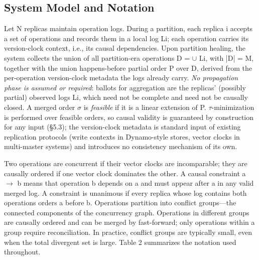 \documentclass[journal]{IEEEtran}
\begin{document}
\subsection{System Model and Notation}
Let N replicas maintain operation logs. During a partition, each replica i accepts a set of operations and records them in a local log Li; each operation carries its version-clock context, i.e., its causal dependencies. Upon partition healing, the system collects the union of all partition-era operations D = $\cup$ Li, with |D| = M, together with the union happens-before partial order P over D, derived from the per-operation version-clock metadata the logs already carry. \emph{No propagation phase is assumed or required}: ballots for aggregation are the replicas' (possibly partial) observed logs Li, which need not be complete and need not be causally closed. A merged order $\sigma$ is \emph{feasible} if it is a linear extension of P. $\tau$-minimization is performed over feasible orders, so causal validity is guaranteed by construction for any input (§5.3); the version-clock metadata is standard input of existing replication protocols (write contexts in Dynamo-style stores, vector clocks in multi-master systems) and introduces no consistency mechanism of its own.

Two operations are concurrent if their vector clocks are incomparable; they are causally ordered if one vector clock dominates the other. A causal constraint a $\rightarrow$ b means that operation b depends on a and must appear after a in any valid merged log. A constraint is unanimous if every replica whose log contains both operations orders a before b. Operations partition into conflict groups—the connected components of the concurrency graph. Operations in different groups are causally ordered and can be merged by fast-forward; only operations within a group require reconciliation. In practice, conflict groups are typically small, even when the total divergent set is large. Table 2 summarizes the notation used throughout.
\end{document}
